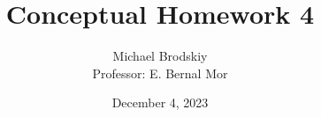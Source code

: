 


\title{Conceptual Homework 4}
\date{December 4, 2023}
\author{Michael Brodskiy\\ \small Professor: E. Bernal Mor}



\maketitle

